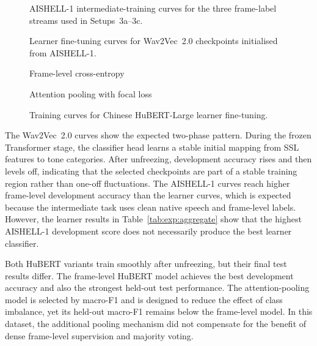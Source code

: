 \begin{figure}[H]
\centering
{}
\caption{AISHELL-1 intermediate-training curves for the three frame-label
streams used in Setups~3a--3c.}
\label{fig:exp:aishell_curves}
\end{figure}

\begin{figure}[H]
\centering
{}
\caption{Learner fine-tuning curves for Wav2Vec~2.0 checkpoints initialised
from AISHELL-1.}
\label{fig:exp:aishell_learner_curves}
\end{figure}

\begin{figure}[H]
\centering
\begin{minipage}{0.49\textwidth}
\centering
{}
\small Frame-level cross-entropy
\end{minipage}
\hfill
\begin{minipage}{0.49\textwidth}
\centering
{}
\small Attention pooling with focal loss
\end{minipage}
\caption{Training curves for Chinese HuBERT-Large learner fine-tuning.}
\label{fig:exp:hubert_curves}
\end{figure}

The Wav2Vec~2.0 curves show the expected two-phase pattern. During the frozen
Transformer stage, the classifier head learns a stable initial mapping from SSL
features to tone categories. After unfreezing, development accuracy rises and
then levels off, indicating that the selected checkpoints are part of a stable
training region rather than one-off fluctuations. The AISHELL-1 curves reach
higher frame-level development accuracy than the learner curves, which is
expected because the intermediate task uses clean native speech and frame-level
labels. However, the learner results in Table~\ref{tab:exp:aggregate} show that
the highest AISHELL-1 development score does not necessarily produce the best
learner classifier.

Both HuBERT variants train smoothly after unfreezing, but their final test
results differ. The frame-level HuBERT model achieves the best development
accuracy and also the strongest held-out test performance. The attention-pooling
model is selected by macro-F1 and is designed to reduce the effect of class
imbalance, yet its held-out macro-F1 remains below the frame-level model. In
this dataset, the additional pooling mechanism did not compensate for the
benefit of dense frame-level supervision and majority voting.

